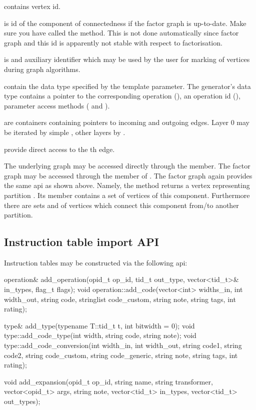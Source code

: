 \begin{description}
  \item {} contains vertex id.
  \item {} is id of the component of connectedness if the factor graph is up-to-date. Make sure you have called the  method. This is not done automatically since factor graph and this id is apparently not stable with respect to factorisation.
  \item {} is and auxiliary identifier which may be used by the user for marking of vertices during graph algorithms.
  \item {} contain the data type specified by the  template parameter. The generator's data type contains a pointer to the corresponding operation (), an operation id (), parameter access methods ( and ). 
  \item {} are containers containing pointers to incoming and outgoing edges. Layer 0 may be iterated by simple , other layers by .
  \item {} provide direct access to the th edge.
\end{description}

The underlying graph may be accessed directly through the  member. The factor graph may be accessed through the  member of . The factor graph again provides the same api as shown above. Namely, the  method returns a vertex representing partition . Its  member contains a set  of vertices of this component. Furthermore there are sets  and  of vertices which connect this component from/to another partition.  

\subsection{Instruction table import API}

Instruction tables may be constructed via the following api:

\mybeginfig
\begin{code}
operation& add_operation(opid_t op_id, tid_t out_type, 
  vector<tid_t>& in_types, flag_t flags);
void operation::add_code(vector<int> widths_in, int width_out, string code, 
  stringlist code_custom, string note, string tags, int rating);

type& add_type(typename T::tid_t t, int bitwidth = 0);
void type::add_code_type(int width, string code, string note);
void type::add_code_conversion(int width_in, int width_out, 
  string code1, string code2, string code_custom, 
  string code_generic, string note, string tags, int rating);

void add_expansion(opid_t op_id, string name, string transformer, 
  vector<opid_t> args, string note, vector<tid_t> in_types, 
  vector<tid_t> out_types);
\end{code}

